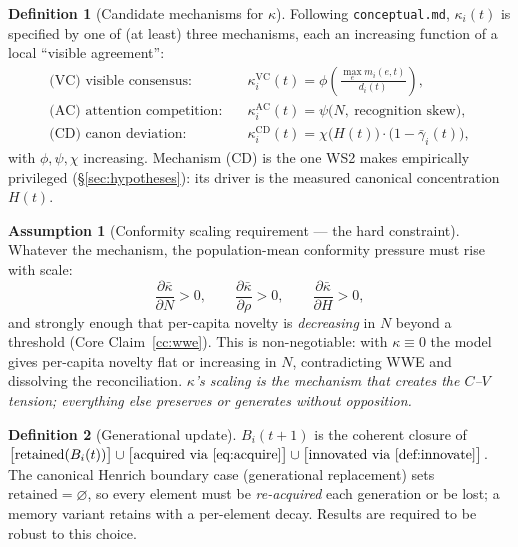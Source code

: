 \documentclass[11pt,letterpaper]{article}
\theoremstyle{definition}
\newtheorem{definition}{Definition}[section]
\newtheorem{assumption}{Assumption}[section]
\theoremstyle{plain}
\begin{document}
\begin{definition}[Candidate mechanisms for $\kappa$]\label{def:kappamech}
Following \texttt{conceptual.md}, $\kappa_i(t)$ is specified by one of (at least)
three mechanisms, each an increasing function of a local ``visible agreement'':
\begin{align}
  \text{(VC) visible consensus:}\quad
    &\kappa^{\mathrm{VC}}_i(t) = \phi\!\left(\tfrac{\max_e m_i(e,t)}{d_i(t)}\right),\\
  \text{(AC) attention competition:}\quad
    &\kappa^{\mathrm{AC}}_i(t) = \psi\big(N,\ \text{recognition skew}\big),\\
  \text{(CD) canon deviation:}\quad
    &\kappa^{\mathrm{CD}}_i(t) = \chi\big(H(t)\big)\cdot\big(1-\bar\gamma_i(t)\big),
\end{align}
with $\phi,\psi,\chi$ increasing. Mechanism (CD) is the one WS2 makes empirically
privileged (\S\ref{sec:hypotheses}): its driver is the measured canonical
concentration $H(t)$.
\end{definition}

\begin{assumption}[Conformity scaling requirement --- the hard constraint]\label{ass:scaling}
Whatever the mechanism, the population-mean conformity pressure must rise with
scale:
\begin{equation}\label{eq:kscale}
  \frac{\partial \bar\kappa}{\partial N} > 0, \qquad
  \frac{\partial \bar\kappa}{\partial \rho} > 0, \qquad
  \frac{\partial \bar\kappa}{\partial H} > 0,
\end{equation}
and strongly enough that per-capita novelty is \emph{decreasing} in $N$ beyond a
threshold (Core Claim~\ref{cc:wwe}). This is non-negotiable: with $\kappa\equiv 0$
the model gives per-capita novelty flat or increasing in $N$, contradicting WWE
and dissolving the reconciliation. \emph{$\kappa$'s scaling is the mechanism that
creates the $C$--$V$ tension; everything else preserves or generates without
opposition.}
\end{assumption}

\begin{definition}[Generational update]
$B_i(t{+}1)$ is the coherent closure of
$\big[\text{retained}(B_i(t))\big]\cup\big[\text{acquired via
\eqref{eq:acquire}}\big]\cup\big[\text{innovated via \ref{def:innovate}}\big]$.
The canonical Henrich boundary case (generational replacement) sets
$\text{retained}=\varnothing$, so every element must be \emph{re-acquired} each
generation or be lost; a memory variant retains with a per-element decay. Results
are required to be robust to this choice.
\end{definition}
\end{document}
